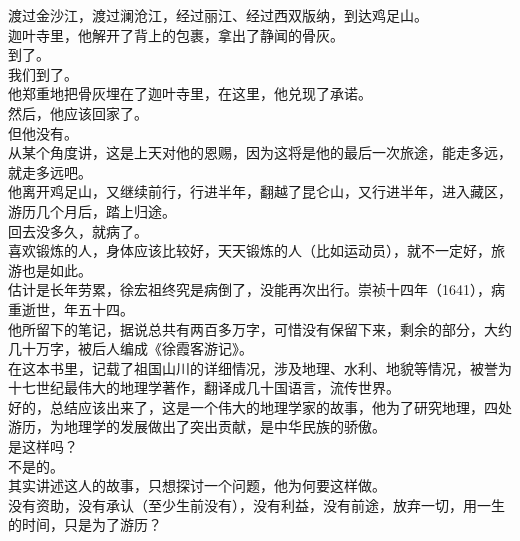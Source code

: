 \begin{multicols}{\theparacolNo}
渡过金沙江，渡过澜沧江，经过丽江、经过西双版纳，到达鸡足山。\\

迦叶寺里，他解开了背上的包裹，拿出了静闻的骨灰。\\

到了。\\

我们到了。\\

他郑重地把骨灰埋在了迦叶寺里，在这里，他兑现了承诺。\\

然后，他应该回家了。\\

但他没有。\\

从某个角度讲，这是上天对他的恩赐，因为这将是他的最后一次旅途，能走多远，就走多远吧。\\

他离开鸡足山，又继续前行，行进半年，翻越了昆仑山，又行进半年，进入藏区，游历几个月后，踏上归途。\\

回去没多久，就病了。\\

喜欢锻炼的人，身体应该比较好，天天锻炼的人（比如运动员），就不一定好，旅游也是如此。\\

估计是长年劳累，徐宏祖终究是病倒了，没能再次出行。崇祯十四年（1641），病重逝世，年五十四。\\

他所留下的笔记，据说总共有两百多万字，可惜没有保留下来，剩余的部分，大约几十万字，被后人编成《徐霞客游记》。\\

在这本书里，记载了祖国山川的详细情况，涉及地理、水利、地貌等情况，被誉为十七世纪最伟大的地理学著作，翻译成几十国语言，流传世界。\\

好的，总结应该出来了，这是一个伟大的地理学家的故事，他为了研究地理，四处游历，为地理学的发展做出了突出贡献，是中华民族的骄傲。\\

是这样吗？\\

不是的。\\

其实讲述这人的故事，只想探讨一个问题，他为何要这样做。\\

没有资助，没有承认（至少生前没有），没有利益，没有前途，放弃一切，用一生的时间，只是为了游历？\\


\end{multicols}
